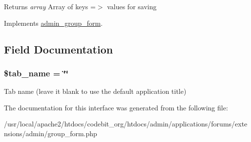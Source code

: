 \begin{DoxyReturn}{Returns}
{\itshape array} Array of keys =$>$ values for saving 
\end{DoxyReturn}


Implements \hyperlink{interfaceadmin__group__form_aa584200e117d7f02d4fabc05b109e51f}{admin\-\_\-group\-\_\-form}.



\subsection{Field Documentation}
\hypertarget{classadmin__group__form____forums_a924f0502d852ff2259cef00e4fa12d94}{
\subsubsection[{\$tab\-\_\-name}]{\setlength{\rightskip}{0pt plus 5cm}\$tab\-\_\-name = \char`\"{}\char`\"{}}}\label{classadmin__group__form____forums_a924f0502d852ff2259cef00e4fa12d94}
Tab name (leave it blank to use the default application title) 

The documentation for this interface was generated from the following file\-:\begin{DoxyCompactItemize}
\item 
/usr/local/apache2/htdocs/codebit\-\_\-org/htdocs/admin/applications/forums/extensions/admin/group\-\_\-form.\-php\end{DoxyCompactItemize}
